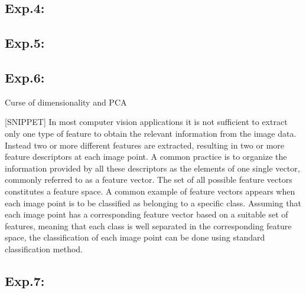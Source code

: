 \vspace{0.5cm}

\subsection{Exp.4: }


\vspace{0.5cm}

\subsection{Exp.5: }


\vspace{0.5cm}

\subsection{Exp.6: }

Curse of dimensionality and PCA

[SNIPPET]
In most computer vision applications it is not sufficient to extract only one type of feature to obtain the relevant information from the image data.
Instead two or more different features are extracted, resulting in two or more feature descriptors at each image point.
A common practice is to organize the information provided by all these descriptors as the elements of one single vector,
commonly referred to as a feature vector. The set of all possible feature vectors constitutes a feature space.
A common example of feature vectors appears when each image point is to be classified as belonging to a specific class.
Assuming that each image point has a corresponding feature vector based on a suitable set of features,
meaning that each class is well separated in the corresponding feature space, the classification of each image point can be done using standard classification method.



\vspace{0.5cm}

\subsection{Exp.7: }


\vspace{0.5cm}





 


